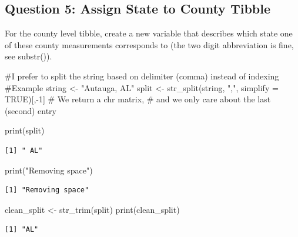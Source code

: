 \documentclass[
  letterpaper,
  DIV=11,
  numbers=noendperiod]{scrartcl}
\newenvironment{Shaded}{\begin{snugshade}}{\end{snugshade}}
\newcommand{\AttributeTok}[1]{\textcolor[rgb]{0.40,0.45,0.13}{#1}}
\newcommand{\CommentTok}[1]{\textcolor[rgb]{0.37,0.37,0.37}{#1}}
\newcommand{\ConstantTok}[1]{\textcolor[rgb]{0.56,0.35,0.01}{#1}}
\newcommand{\DecValTok}[1]{\textcolor[rgb]{0.68,0.00,0.00}{#1}}
\newcommand{\FunctionTok}[1]{\textcolor[rgb]{0.28,0.35,0.67}{#1}}
\newcommand{\NormalTok}[1]{\textcolor[rgb]{0.00,0.23,0.31}{#1}}
\newcommand{\OtherTok}[1]{\textcolor[rgb]{0.00,0.23,0.31}{#1}}
\newcommand{\SpecialCharTok}[1]{\textcolor[rgb]{0.37,0.37,0.37}{#1}}
\newcommand{\StringTok}[1]{\textcolor[rgb]{0.13,0.47,0.30}{#1}}
\begin{document}
\subsection{Question 5: Assign State to County
Tibble}\label{question-5-assign-state-to-county-tibble}

For the county level tibble, create a new variable that describes which
state one of these county measurements corresponds to (the two digit
abbreviation is fine, see substr()).

\begin{Shaded}
\begin{Highlighting}[]
\CommentTok{\#I prefer to split the string based on delimiter (comma) instead of indexing}
\CommentTok{\#Example}
\NormalTok{string }\OtherTok{\textless{}{-}} \StringTok{"Autauga, AL"}
\NormalTok{split }\OtherTok{\textless{}{-}} \FunctionTok{str\_split}\NormalTok{(string, }\StringTok{","}\NormalTok{, }\AttributeTok{simplify =} \ConstantTok{TRUE}\NormalTok{)[,}\SpecialCharTok{{-}}\DecValTok{1}\NormalTok{] }\CommentTok{\# We return a chr matrix, }
\CommentTok{\# and we only care about the last (second) entry}

\FunctionTok{print}\NormalTok{(split)}
\end{Highlighting}
\end{Shaded}

\begin{verbatim}
[1] " AL"
\end{verbatim}

\begin{Shaded}
\begin{Highlighting}[]
\FunctionTok{print}\NormalTok{(}\StringTok{"Removing space"}\NormalTok{)}
\end{Highlighting}
\end{Shaded}

\begin{verbatim}
[1] "Removing space"
\end{verbatim}

\begin{Shaded}
\begin{Highlighting}[]
\NormalTok{clean\_split }\OtherTok{\textless{}{-}} \FunctionTok{str\_trim}\NormalTok{(split)}
\FunctionTok{print}\NormalTok{(clean\_split)}
\end{Highlighting}
\end{Shaded}

\begin{verbatim}
[1] "AL"
\end{verbatim}
\end{document}
